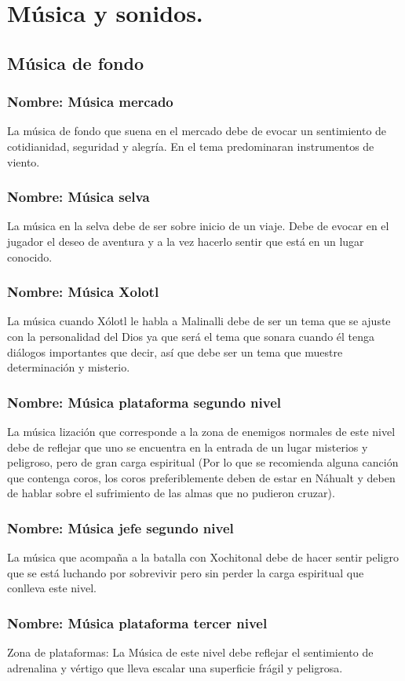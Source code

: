 \documentclass[11pt,letterpaper]{article}
\begin{document}
\section{Música  y sonidos.}
\subsection{Música  de fondo}
\subsubsection{Nombre: Música  mercado}
La música de fondo que suena en el mercado debe de evocar un sentimiento de cotidianidad, seguridad y alegría. En el tema predominaran instrumentos de viento. 		
\subsubsection{Nombre: Música  selva}
La música en la selva debe de ser sobre inicio de un viaje. Debe de evocar en el jugador el deseo de aventura y a la vez hacerlo sentir que está en un lugar conocido.
\subsubsection{Nombre: Música  Xolotl} 
La música cuando Xólotl le habla a Malinalli debe de ser un tema que se ajuste con la personalidad del Dios ya que será el tema que sonara cuando él tenga diálogos importantes que decir, así que debe ser un tema que muestre determinación y misterio.
\subsubsection{Nombre: Música plataforma segundo nivel}
La música lización que corresponde a la zona de enemigos normales de este nivel debe de reflejar que uno se encuentra en la entrada de un lugar misterios y peligroso, pero de gran carga espiritual (Por lo que se recomienda alguna canción que contenga coros, los coros preferiblemente deben de estar en Náhualt y deben de hablar sobre el sufrimiento de las almas que no pudieron cruzar).
\subsubsection{Nombre: Música jefe segundo nivel}
La música que acompaña a la batalla con Xochitonal debe de hacer sentir peligro que se está luchando por sobrevivir pero sin perder la carga espiritual que conlleva este nivel. 
\subsubsection{Nombre: Música plataforma tercer nivel} Zona de plataformas: La Música  de este nivel debe reflejar el sentimiento de adrenalina y vértigo que lleva escalar una superficie frágil y peligrosa.
\end{document}
